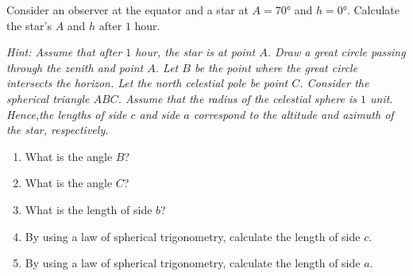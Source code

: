 \documentclass[main.tex]{subfiles}
\begin{document}
\begin{q}{5}
Consider an observer at the equator and a star at $A = \ang{70}$ and $h =
\ang{0}$. Calculate the star's $A$ and $h$ after $1$ hour.

\noindent\textit{Hint: Assume that after $1$ hour, the star is at point $A$.
Draw a great circle passing through the zenith and point $A$. Let $B$ be the
point where the great circle intersects the horizon. Let the north celestial
pole be point $C$. Consider the spherical triangle $ABC$. Assume that the radius
of the celestial sphere is $1$ unit. Hence,the lengths of side $c$ and side $a$
correspond to the altitude and azimuth of the star, respectively.}
\begin{enumerate}[label=\text{(\alph*)}]
    \item What is the angle $B$?
    \item What is the angle $C$?
    \item What is the length of side $b$?
    \item By using a law of spherical trigonometry, calculate the length of side
    $c$.
    \item By using a law of spherical trigonometry, calculate the length of side
    $a$.
\end{enumerate}
\end{q}
\end{document}
